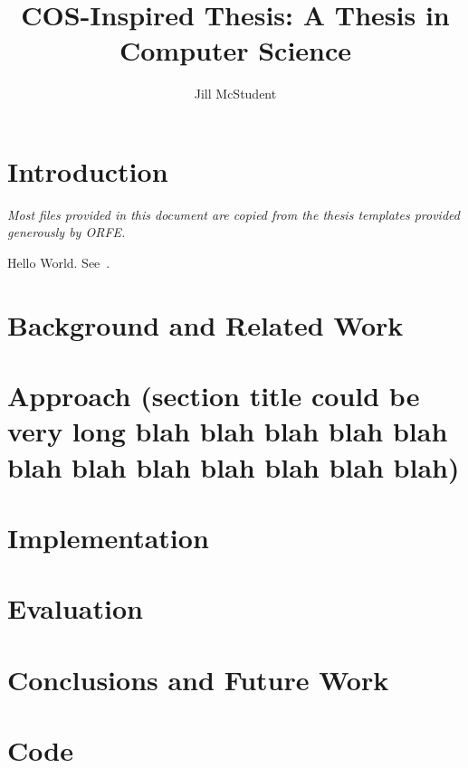 \documentclass[12pt,lot,lof]{puthesis_undergraduate}
\title{COS-Inspired Thesis: A Thesis in Computer Science}
\author{Jill McStudent}
\begin{document}
\chapter{Introduction}\label{ch:intro}  %

\emph{Most files provided in this document are copied from the thesis templates provided generously by ORFE.}

Hello World. See~\cite{A01}.


\chapter{Background and Related Work}  %


\chapter{Approach (section title could be very long blah blah blah blah blah blah blah blah blah blah blah blah)} 


\chapter{Implementation}


\chapter{Evaluation}


\chapter{Conclusions and Future Work}


\appendix
\chapter{Code}



 \label{bib}
\end{document}
